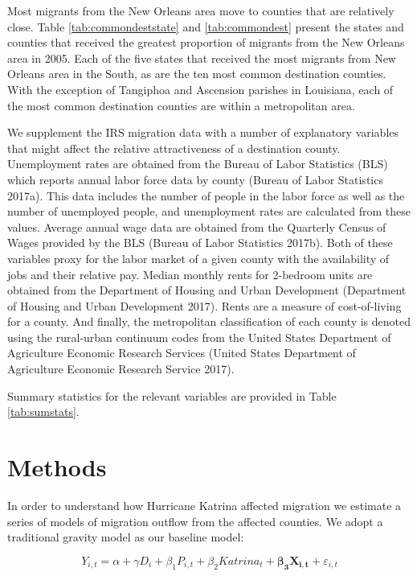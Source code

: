 \documentclass[]{article}
\begin{document}
Most migrants from the New Orleans area move to counties that are
relatively close. Table \ref{tab:commondeststate} and
\ref{tab:commondest} present the states and counties that received the
greatest proportion of migrants from the New Orleans area in 2005. Each
of the five states that received the most migrants from New Orleans area
in the South, as are the ten most common destination counties. With the
exception of Tangiphoa and Ascension parishes in Louisiana, each of the
most common destination counties are within a metropolitan area.

We supplement the IRS migration data with a number of explanatory
variables that might affect the relative attractiveness of a destination
county. Unemployment rates are obtained from the Bureau of Labor
Statistics (BLS) which reports annual labor force data by county (Bureau
of Labor Statistics 2017a). This data includes the number of people in
the labor force as well as the number of unemployed people, and
unemployment rates are calculated from these values. Average annual wage
data are obtained from the Quarterly Census of Wages provided by the BLS
(Bureau of Labor Statistics 2017b). Both of these variables proxy for
the labor market of a given county with the availability of jobs and
their relative pay. Median monthly rents for 2-bedroom units are
obtained from the Department of Housing and Urban Development
(Department of Housing and Urban Development 2017). Rents are a measure
of cost-of-living for a county. And finally, the metropolitan
classification of each county is denoted using the rural-urban continuum
codes from the United States Department of Agriculture Economic Research
Services (United States Department of Agriculture Economic Research
Service 2017).

Summary statistics for the relevant variables are provided in Table
\ref{tab:sumstats}.

\section{\texorpdfstring{Methods
\label{sec:methods}}{Methods }}\label{methods}

In order to understand how Hurricane Katrina affected migration we
estimate a series of models of migration outflow from the affected
counties. We adopt a traditional gravity model as our baseline model:

\[ Y_{i,t} = \alpha + \gamma {D}_{i} + \beta_1 {P}_{i,t} + \beta_2 {Katrina}_{t} + \mathbf{\beta_3} \mathbf{X_{i,t}} + \varepsilon_{i,t} \label{eq:basereg} \]
\end{document}
